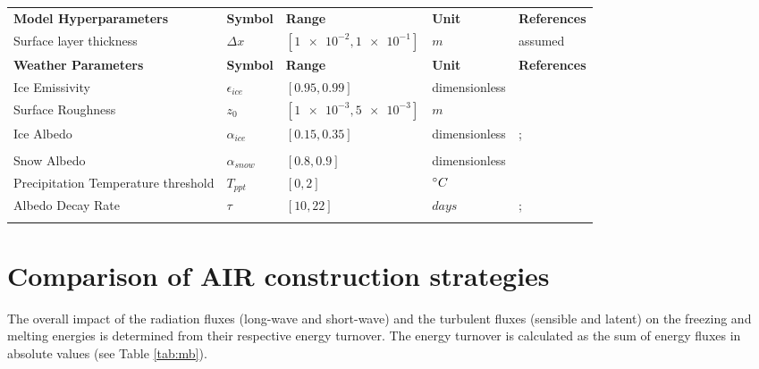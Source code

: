 \documentclass[tc, manuscript]{copernicus}
\begin{document}
\begin{table}
\begin{tabular}{lllll}
		\textbf{Model Hyperparameters} & \textbf{Symbol} & \textbf{Range} & \textbf{Unit} & \textbf{References} \\
    Surface layer thickness             & $\Delta x$            & $[\num{1e-2},\num{1e-1}]$           & $m$ & assumed
    \\\midrule
		\textbf{Weather Parameters} & \textbf{Symbol} & \textbf{Range} & \textbf{Unit} & \textbf{References} \\
    Ice Emissivity                      & $\epsilon_{ice}$      & $[0.95,0.99]$         & dimensionless & \citet{horiInsituMeasuredSpectral2006}             \\
    Surface Roughness                   & $z_0$                 & $[\num{1e-3},\num{5e-3}]$            & $m$  & \citet{brockMeasurementParameterizationAerodynamic2006}       \\
    Ice Albedo                          & $\alpha_{ice}$        & $[0.15,0.35]$         & dimensionless  &
    \citet{steinerModellingIcecliffBackwasting2015};            \\
    & &    &  & \citet{zollesRobustUncertaintyAssessment2019}      \\
    Snow Albedo                         & $\alpha_{snow}$       & $[0.8,0.9]$        & dimensionless  & \citet{zollesRobustUncertaintyAssessment2019}              \\
    Precipitation Temperature threshold & $T_{ppt}$             & $[0,2]$            & $^{\circ} C$& \citet{shichangResponseZhadangGlacier2010}  \\
    Albedo Decay Rate                   & $\tau$                & $[10,22]$           & $days$ &
    \citet{schmidtImportanceAccurateGlacier2017};      \\
    & &    &  & \citet{oerlemansYearRecordGlobal1998}      \\\midrule
	\end{tabular}
\end{table}
\clearpage

\section{Comparison of AIR construction strategies} \label{sec:MBEB}

The overall impact of the radiation fluxes (long-wave and short-wave) and the turbulent fluxes (sensible and
latent) on the freezing and melting energies is determined from their respective energy turnover. The energy
turnover is calculated as the sum of energy fluxes in absolute values (see Table \ref{tab:mb}). 
\end{document}
